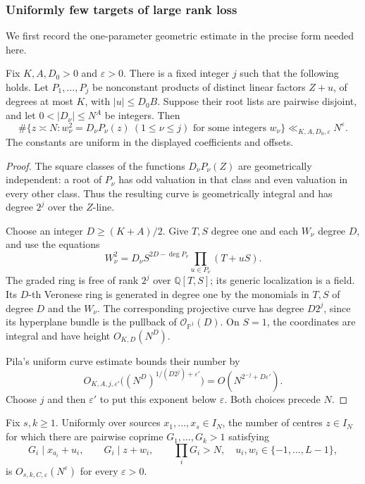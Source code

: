 \subsubsection{Uniformly few targets of large rank loss}

We first record the one-parameter geometric estimate in the
precise form needed here.

\begin{lemma}
\label{p1:fixed:curve}
Fix \(K,A,D_0>0\) and \(\varepsilon>0\).
There is a fixed integer \(j\) such that the following holds.
Let \(P_1,\ldots,P_j\) be nonconstant products of distinct
linear factors \(Z+u\), of degrees at most \(K\), with
\(|u|\le D_0B\). Suppose their root lists are pairwise disjoint,
and let \(0<|D_\nu|\le N^A\) be integers. Then
\[
 \#\{z\asymp N:
       w_\nu^2=D_\nu P_\nu(z)\ (1\le\nu\le j)
       \text{ for some integers }w_\nu\}
       \ll_{K,A,D_0,\varepsilon}N^\varepsilon .
\]
The constants are uniform in the displayed coefficients and
offsets.
\end{lemma}

\begin{proof}
The square classes of the functions \(D_\nu P_\nu(Z)\) are
geometrically independent: a root of \(P_\nu\) has odd
valuation in that class and even valuation in every other
class. Thus the resulting curve is geometrically integral
and has degree \(2^j\) over the \(Z\)-line.

Choose an integer \(D\ge(K+A)/2\). Give \(T,S\) degree one
and each \(W_\nu\) degree \(D\), and use the equations
\[
 W_\nu^2
   =D_\nu S^{2D-\deg P_\nu}
       \prod_{u\in P_\nu}(T+uS).
\]
The graded ring is free of rank \(2^j\) over \(\mathbb Q[T,S]\);
its generic localization is a field. Its \(D\)-th Veronese
ring is generated in degree one by the monomials in \(T,S\)
of degree \(D\) and the \(W_\nu\). The corresponding
projective curve has degree \(D2^j\), since its hyperplane
bundle is the pullback of \(\mathcal O_{\mathbb P^1}(D)\).
On \(S=1\), the coordinates are integral and have height
\(O_{K,D}(N^D)\).

Pila's uniform curve estimate
\cite[Theorem~A]{pila1995} bounds their number by
\[
 O_{K,A,j,\varepsilon'}
 \bigl((N^D)^{1/(D2^j)+\varepsilon'}\bigr)
       =O(N^{2^{-j}+D\varepsilon'}).
\]
Choose \(j\) and then \(\varepsilon'\) to put this exponent
below \(\varepsilon\). Both choices precede \(N\).
\end{proof}

\begin{lemma}
\label{p1:fixed:CRT}
Fix \(s,k\ge1\). Uniformly over sources
\(x_1,\ldots,x_s\in I_N\), the number of centres \(z\in I_N\)
for which there are pairwise coprime \(G_1,\ldots,G_k>1\)
satisfying
\[
 G_i\mid x_{a_i}+u_i,\qquad G_i\mid z+w_i,\qquad
 \prod_iG_i>N,
 \quad u_i,w_i\in\{-1,\ldots,L-1\},
\]
is \(O_{s,k,C,\varepsilon}(N^\varepsilon)\) for every
\(\varepsilon>0\).
\end{lemma}

